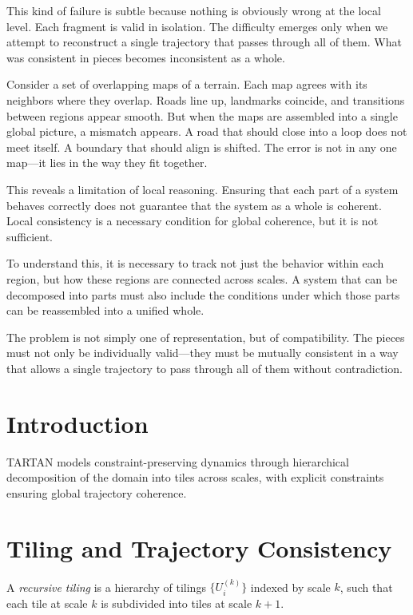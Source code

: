 \documentclass[11pt,openany]{book}
\begin{document}
This kind of failure is subtle because nothing is obviously wrong at the local level. Each fragment is valid in isolation. The difficulty emerges only when we attempt to reconstruct a single trajectory that passes through all of them. What was consistent in pieces becomes inconsistent as a whole.

Consider a set of overlapping maps of a terrain. Each map agrees with its neighbors where they overlap. Roads line up, landmarks coincide, and transitions between regions appear smooth. But when the maps are assembled into a single global picture, a mismatch appears. A road that should close into a loop does not meet itself. A boundary that should align is shifted. The error is not in any one map—it lies in the way they fit together.

This reveals a limitation of local reasoning. Ensuring that each part of a system behaves correctly does not guarantee that the system as a whole is coherent. Local consistency is a necessary condition for global coherence, but it is not sufficient.

To understand this, it is necessary to track not just the behavior within each region, but how these regions are connected across scales. A system that can be decomposed into parts must also include the conditions under which those parts can be reassembled into a unified whole.

The problem is not simply one of representation, but of compatibility. The pieces must not only be individually valid—they must be mutually consistent in a way that allows a single trajectory to pass through all of them without contradiction.

\section{Introduction}
\label{sec:introduction-tartan}

TARTAN models constraint-preserving dynamics through
hierarchical decomposition of the domain into tiles across
scales, with explicit constraints ensuring global trajectory
coherence.

\section{Tiling and Trajectory Consistency}
\label{sec:tiling}

\begin{definition}
A \emph{recursive tiling} is a hierarchy of tilings
$\{U_i^{(k)}\}$ indexed by scale $k$, such that each tile
at scale $k$ is subdivided into tiles at scale $k+1$.
\end{definition}
\end{document}
